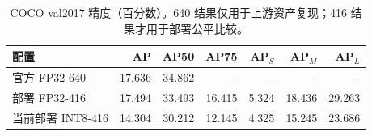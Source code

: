 \begin{table}[t]
\centering
\caption{COCO val2017 精度（百分数）。640 结果仅用于上游资产复现；416 结果才用于部署公平比较。}
\label{tab:accuracy}
\small
\begin{tabular}{lrrrrrr}
\toprule
配置 & AP & AP50 & AP75 & AP$_S$ & AP$_M$ & AP$_L$ \\
\midrule
官方 FP32-640 & 17.636 & 34.862 & -- & -- & -- & -- \\
部署 FP32-416 & 17.494 & 33.493 & 16.415 & 5.324 & 18.436 & 29.263 \\
当前部署 INT8-416 & 14.304 & 30.212 & 12.145 & 4.325 & 15.245 & 23.686 \\
\bottomrule
\end{tabular}
\end{table}
